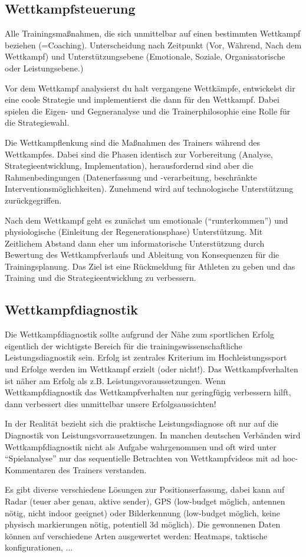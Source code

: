 \subsection{Wettkampfsteuerung}

Alle Trainingsmaßnahmen, die sich unmittelbar auf einen bestimmten
Wettkampf beziehen (=Coaching).
Unterscheidung nach Zeitpunkt (Vor, Während, Nach dem Wettkampf) und Unterstützungsebene (Emotionale, Soziale, Organisatorische oder Leistungsebene.)

Vor dem Wettkampf analysierst du halt vergangene Wettkämpfe, entwickelst dir eine coole Strategie und implementierst die dann für den Wettkampf.
Dabei spielen die Eigen- und Gegneranalyse und die Trainerphilosophie eine Rolle für die Strategiewahl.

Die Wettkampflenkung sind die Maßnahmen des Trainers während des Wettkampfes. Dabei sind die Phasen identisch zur Vorbereitung (Analyse, Strategieentwicklung, Implementation), herausfordernd sind aber die Rahmenbedingungen (Datenerfassung und -verarbeitung, beschränkte Interventionsmöglichkeiten). Zunehmend wird auf technologische Unterstützung zurückgegriffen.

Nach dem Wettkampf geht es zunächst um emotionale (``runterkommen'') und physiologische (Einleitung der Regenerationsphase) Unterstützung. Mit Zeitlichem Abstand dann eher um informatorische Unterstützung durch Bewertung des Wettkampfverlaufs und Ableitung von Konsequenzen für die Trainingsplanung. Das Ziel ist eine Rückmeldung für Athleten zu geben und das Training  und die Strategieentwicklung zu verbessern.

\subsection{Wettkampfdiagnostik}

Die Wettkampfdiagnostik sollte aufgrund der Nähe zum sportlichen Erfolg eigentlich der wichtigste Bereich für die trainingswissenschaftliche Leistungsdiagnostik sein.
Erfolg ist zentrales Kriterium im Hochleistungssport und Erfolge werden im
Wettkampf erzielt (oder nicht!). Das Wettkampfverhalten ist näher am Erfolg als z.B. Leistungsvoraussetzungen. Wenn Wettkampfdiagnostik das Wettkampfverhalten nur geringfügig verbessern hilft, dann verbessert dies unmittelbar unsere Erfolgsaussichten!

In der Realität bezieht sich die praktische Leistungsdiagnose oft nur auf die Diagnostik von Leistungsvorrausetzungen. In manchen deutschen Verbänden wird Wettkampfdiagnostik nicht als Aufgabe wahrgenommen und oft wird unter ``Spielanalyse'' nur das sequentielle Betrachten von Wettkampfvideos mit ad hoc-Kommentaren des Trainers verstanden.

Es gibt diverse verschiedene Lösungen zur Positionserfassung, dabei kann auf Radar (teuer aber genau, aktive sender), GPS (low-budget möglich, antennen nötig, nicht indoor geeignet) oder Bilderkennung (low-budget möglich, keine physisch markierungen nötig, potentiell 3d möglich).
Die gewonnenen Daten können auf verschiedene Arten ausgewertet werden: Heatmaps, taktische konfigurationen, ...


